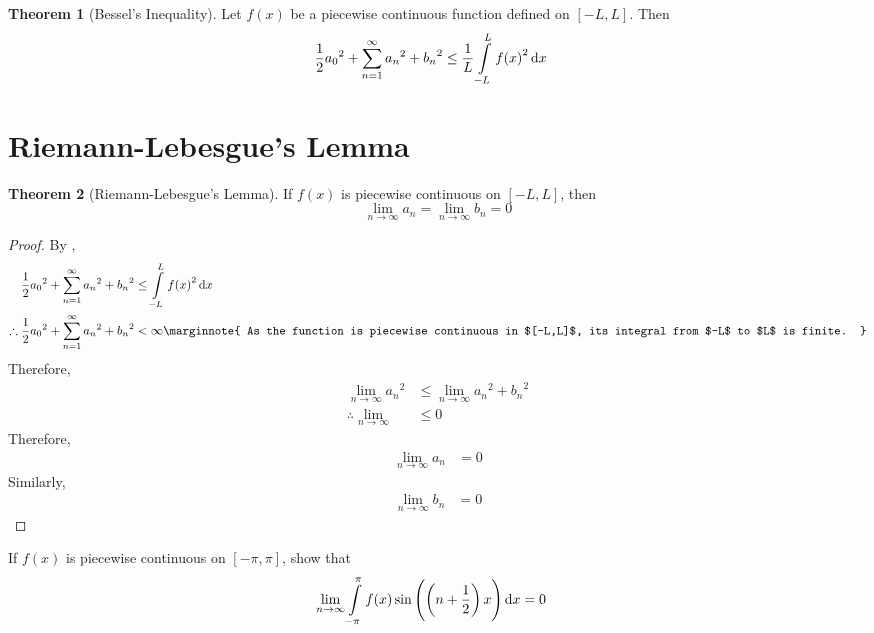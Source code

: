 \documentclass[fleqn, a4paper, 12pt, twoside]{article}
\theoremstyle{definition}
\theoremstyle{theorem}
\newtheorem{theorem}{Theorem}
\begin{document}
\begin{theorem}[Bessel's Inequality]
	Let $f(x)$ be a piecewise continuous function defined on $[-L,L]$.
	Then
	\begin{align*}
		\frac{1}{2} {a_0}^2 + \sum\limits_{n = 1}^{\infty} {a_n}^2 + {b_n}^2 &\le \frac{1}{L} \int\limits_{-L}^{L} {f(x)}^2 \dif x
	\end{align*}
	\label{Bessel's_Inequality}
\end{theorem}

\section{Riemann-Lebesgue's Lemma}

\begin{theorem}[Riemann-Lebesgue's Lemma]
	If $f(x)$ is piecewise continuous on $[-L,L]$, then
	\begin{equation*}
		\lim\limits_{n \to \infty} a_n = \lim\limits_{n \to \infty} b_n = 0
	\end{equation*}
	\label{Riemann-Lebesgue's_Lemma}
\end{theorem}

\begin{proof}
	By ,
	\begin{align*}
		\frac{1}{2} {a_0}^2 + \sum\limits_{n = 1}^{\infty} {a_n}^2 + {b_n}^2 &\le \int\limits_{-L}^{L} {f(x)}^2 \dif x\\
		\therefore \frac{1}{2} {a_0}^2 + \sum\limits_{n = 1}^{\infty} {a_n}^2 + {b_n}^2 &< \infty
		\marginnote
		{
			As the function is piecewise continuous in $[-L,L]$, its integral from $-L$ to $L$ is finite.
		}
	\end{align*}
	Therefore,
	\begin{align*}
		\lim\limits_{n \to \infty} {a_n}^2 &\le \lim\limits_{n \to \infty} {a_n}^2 + {b_n}^2\\
		\therefore \lim\limits_{n \to \infty} &\le 0
	\end{align*}
	Therefore,
	\begin{align*}
		\lim\limits_{n \to \infty} a_n &= 0
	\end{align*}
	Similarly,
	\begin{align*}
		\lim\limits_{n \to \infty} b_n &= 0
	\end{align*}
\end{proof}

\begin{question}
	If $f(x)$ is piecewise continuous on $[-\pi,\pi]$, show that
	\begin{align*}
		\lim\limits_{n \to \infty} \int\limits_{-\pi}^{\pi} f(x) \sin\left( \left( n + \frac{1}{2} \right) x \right) \dif x &= 0
	\end{align*}
\end{question}
\end{document}
